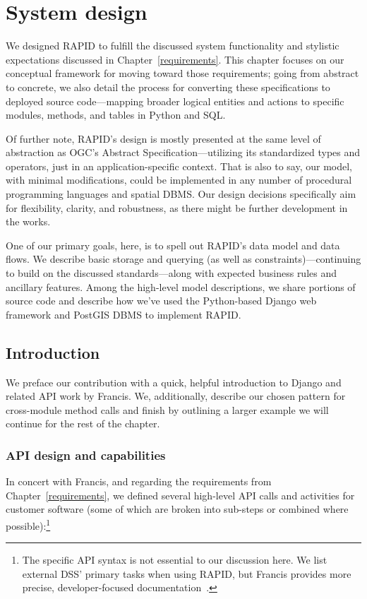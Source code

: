 \chapter{System design}
\label{design}

We designed RAPID to fulfill the discussed system functionality and stylistic expectations discussed in Chapter~\ref{requirements}. This chapter focuses on our conceptual framework for moving toward those requirements; going from abstract to concrete, we also detail the process for converting these specifications to deployed source code---mapping broader logical entities and actions to specific modules, methods, and tables in Python and SQL.

Of further note, RAPID's design is mostly presented at the same level of abstraction as OGC's Abstract Specification---utilizing its standardized types and operators, just in an application-specific context. That is also to say, our model, with minimal modifications, could be implemented in any number of procedural programming languages and spatial DBMS. Our design decisions specifically aim for flexibility, clarity, and robustness, as there might be further development in the works.

One of our primary goals, here, is to spell out RAPID's data model and data flows. We describe basic storage and querying (as well as constraints)---continuing to build on the discussed standards---along with expected business rules and ancillary features. Among the high-level model descriptions, we share portions of source code and describe how we've used the Python-based Django web framework and PostGIS DBMS to implement RAPID.


\section{Introduction}
We preface our contribution with a quick, helpful introduction to Django and related API work by Francis. We, additionally, describe our chosen pattern for cross-module method calls and finish by outlining a larger example we will continue for the rest of the chapter.

\subsection{API design and capabilities}
In concert with Francis, and regarding the requirements from Chapter~\ref{requirements}, we defined several high-level API calls and activities for customer software (some of which are broken into sub-steps or combined where possible):\footnote{The specific API syntax is not essential to our discussion here. We list external DSS' primary tasks when using RAPID, but Francis provides more precise, developer-focused documentation~\cite{Francis}.}

